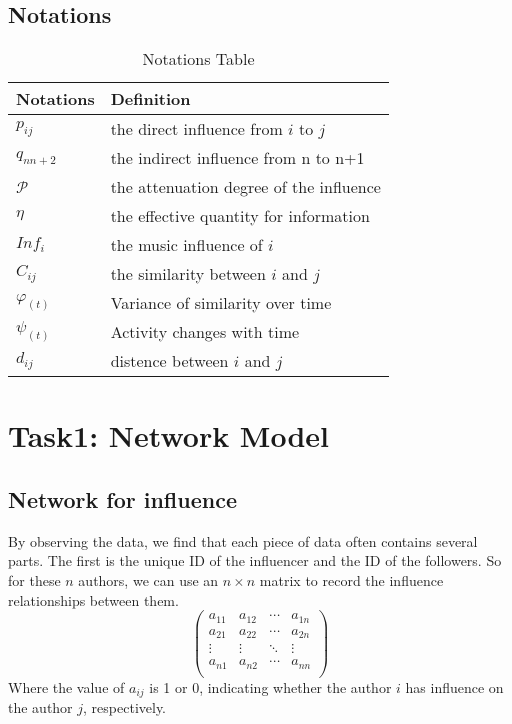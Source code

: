 \documentclass[12pt]{article}  %
\begin{document}
\subsection{Notations}
\begin{table}[H]
	\centering
	\begin{tabular}{ll}
		\hline
		\hline
		\multicolumn{1}{c}{\textbf{Notations}} & \textbf{Definition}\\ \hline
		$p_{ij}$                      & the direct influence from $i$ to $j$                      \\
		$q_{nn+2}$                      & the indirect influence from n to n+1                      \\
		$\mathcal{P}$                       & the attenuation degree of the influence                      \\
		$\eta$                      & the effective quantity for information                      \\
		$Inf_{i}$                      & the music influence of $i$                      \\
		$C_{ij}$                      & the similarity between $i$ and $j$                      \\
		$\varphi _(t)$                      &  Variance of similarity over time                     \\
		$\psi _(t)$                      & Activity changes with time                     \\
		$d_{ij}$                      & distence between $i$ and $j$                      \\                     
		\hline
		\hline
	\end{tabular}
	\caption{Notations Table}
\end{table}
\section{Task1: Network Model}
\subsection{Network for influence}

By observing the data, we find that each piece of data often contains several parts. The first is the unique ID of the influencer and the ID of the followers. So for these $n$ authors, we can use an $n\times n$ matrix to record the influence relationships between them.
\begin{equation}
\begin{pmatrix}
a_{11}&a_{12}&\cdots&a_{1n}\\
a_{21}&a_{22}&\cdots&a_{2n}\\
\vdots&\vdots&\ddots&\vdots\\
a_{n1}&a_{n2}&\cdots&a_{nn}\\
\end{pmatrix}
\end{equation}
Where the value of $a_{ij}$ is 1 or 0, indicating whether the author $i$ has influence on the author $j$, respectively. 
\end{document}
